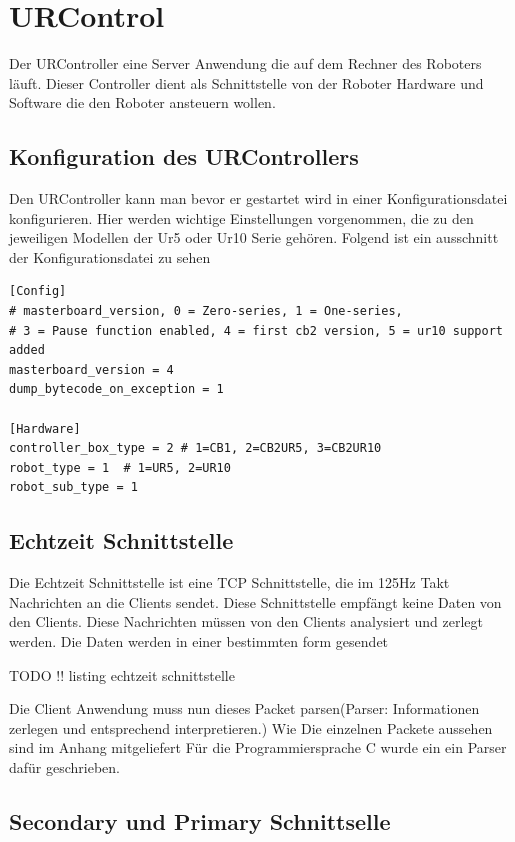 \section{URControl}
\label{sec:ur_control_gru}

Der URController eine Server Anwendung die auf dem Rechner des Roboters läuft. 
Dieser Controller dient als Schnittstelle von der Roboter Hardware und Software die den Roboter ansteuern wollen.

\subsection{Konfiguration des URControllers}
\label{urcontrol_rci_gru}

Den URController kann man bevor er gestartet wird in einer Konfigurationsdatei konfigurieren.
Hier werden wichtige Einstellungen vorgenommen, die zu den jeweiligen Modellen der Ur5 oder Ur10 Serie gehören. Folgend ist ein ausschnitt der Konfigurationsdatei zu sehen
\\
\begin{lstlisting}
[Config]
# masterboard_version, 0 = Zero-series, 1 = One-series, 
# 3 = Pause function enabled, 4 = first cb2 version, 5 = ur10 support added
masterboard_version = 4
dump_bytecode_on_exception = 1

[Hardware]
controller_box_type = 2 # 1=CB1, 2=CB2UR5, 3=CB2UR10
robot_type = 1  # 1=UR5, 2=UR10
robot_sub_type = 1
\end{lstlisting}

\subsection{Echtzeit Schnittstelle}
\label{urcontrol_rci_gru}

Die Echtzeit Schnittstelle ist eine TCP Schnittstelle, die im 125Hz Takt Nachrichten an die Clients sendet. Diese Schnittstelle empfängt keine Daten von den Clients. Diese Nachrichten müssen von den Clients analysiert und zerlegt werden. Die Daten werden in einer bestimmten form gesendet

TODO !! listing echtzeit schnittstelle

Die Client Anwendung muss nun dieses Packet parsen(Parser: Informationen zerlegen und entsprechend interpretieren.)
Wie Die einzelnen Packete aussehen sind im Anhang mitgeliefert
Für die Programmiersprache C wurde ein ein Parser dafür geschrieben.

\subsection{Secondary und Primary Schnittselle}
\label{urcontrol_spi_gru}

